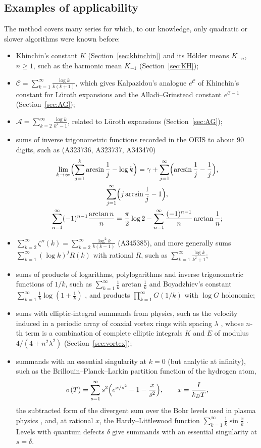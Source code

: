 \documentclass[11pt,reqno]{amsart}
\theoremstyle{definition}
\theoremstyle{remark}
\begin{document}
\subsection{Examples of applicability}
The method covers many series for which, to our knowledge, only quadratic or slower
algorithms were known before:
\begin{itemize}
\item Khinchin's constant $K$ (Section~\ref{sec:khinchin}) and its H\"older means $K_{-n}$, $n \ge 1$, such as the
harmonic mean $K_{-1}$ (Section~\ref{sec:KH});
\item $\mathcal C = \sum_{k=1}^{\infty}\frac{\log k}{k(k+1)}$, which gives Kalpazidou's analogue $e^{\mathcal C}$ of Khinchin's constant
for L\"uroth expansions and the Alladi--Grinstead constant $e^{\mathcal C - 1}$ (Section~\ref{sec:AG});
\item $\mathcal A = \sum_{k=2}^{\infty}\frac{\log k}{k^2-1}$, related to L\"uroth expansions (Section~\ref{sec:AG});
\item sums of inverse trigonometric functions recorded in the OEIS \cite{OEIS} to about $90$ digits, such as
(A323736, A323737, A343470)
\begin{gather*}
  \lim_{k\to\infty}\Bigl(\sum_{j=1}^{k}\arcsin\frac1j - \log k\Bigr)
    = \gamma + \sum_{j=1}^{\infty}\Bigl(\arcsin\frac1j - \frac1j\Bigr), \\
  \sum_{j=1}^{\infty}\Bigl(j\arcsin\frac1j - 1\Bigr), \\
  \sum_{n=1}^{\infty}(-1)^{n-1}\frac{\arctan n}{n} = \frac\pi2\log2 - \sum_{n=1}^{\infty}\frac{(-1)^{n-1}}{n}\arctan\frac1n;
\end{gather*}
\item $\sum_{k=2}^{\infty}\zeta''(k) = \sum_{k=2}^{\infty}\frac{\log^2 k}{k(k-1)}$ \cite[p.~538]{Fin18} (A345385), and more generally sums
$\sum_{k=1}^{\infty} (\log k)^j R(k)$ with rational $R$, such as $\sum_{k=1}^{\infty} \frac{\log k}{k^2+1}$;
\item sums of products of logarithms, polylogarithms and inverse trigonometric functions of $1/k$, such as
$\sum_{k=1}^{\infty} \frac1k\arctan\frac1k$ and Boyadzhiev's constant $\sum_{k=1}^{\infty}\frac1k\log(1+\frac1k)$ \cite{Boy19}, and products
$\prod_{k=1}^{\infty} G(1/k)$ with $\log G$ holonomic;
\item sums with elliptic-integral summands from physics, such as the velocity induced in a periodic array of
coaxial vortex rings with spacing $\lambda$ \cite{MS22}, whose $n$-th term is a combination of complete elliptic
integrals $K$ and $E$ of modulus $4/(4+n^2\lambda^2)$ (Section~\ref{sec:vortex});
\item summands with an essential singularity at $k = 0$ (but analytic at infinity), such as the
Brillouin--Planck--Larkin partition function of the hydrogen atom,
\[
  \sigma(T) = \sum_{s=1}^{\infty}s^2\Bigl(e^{x/s^2} - 1 - \frac{x}{s^2}\Bigr), \qquad x = \frac{I}{k_BT},
\]
the subtracted form of the divergent
sum over the Bohr levels used in plasma physics \cite{EKR11}, and, at rational $x$, the Hardy--Littlewood
function $\sum_{k=1}^{\infty}\frac1k\sin\frac xk$ \cite{Gau05}. Levels with quantum defects $\delta$ give summands
with an essential singularity at $s = \delta$.
\end{itemize}
\end{document}
